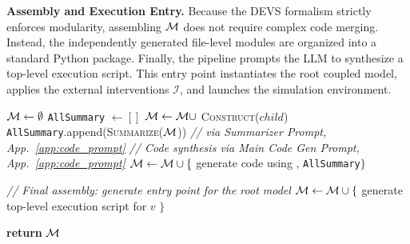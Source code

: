 \noindent\textbf{Assembly and Execution Entry.} 
Because the DEVS formalism strictly enforces modularity, assembling $\mathcal{M}$ does not require complex code merging. Instead, the independently generated file-level modules are organized into a standard Python package. Finally, the pipeline prompts the LLM to synthesize a top-level execution script. This entry point instantiates the root coupled model, applies the external interventions $\mathcal{I}$, and launches the simulation environment.


\begin{algorithm}[t]
\caption{\textsc{Stage 2: Behavioral Synthesis}}
\label{alg:devs_construct}
\begin{algorithmic}[1]
    \State $\mathcal{M} \leftarrow \emptyset$
    \State \texttt{AllSummary} $\leftarrow []$
        \State $\mathcal{M} \leftarrow \mathcal{M}\cup$ \textsc{Construct}($child$)
        \State \texttt{AllSummary}.append(\textsc{Summarize}($\mathcal{M}$)) \textit{// via Summarizer Prompt, App.~\ref{app:code_prompt}}
    \EndFor
    \State \textit{// Code synthesis via Main Code Gen Prompt, App.~\ref{app:code_prompt}}
    \State $\mathcal{M} \leftarrow \mathcal{M}\cup\{$ generate code using \plantree, \texttt{AllSummary}$\}$

    \State \textit{// Final assembly: generate entry point for the root model}
        \State $\mathcal{M} \leftarrow \mathcal{M} \cup \{$ generate top-level execution script for $v$ $\}$
    \EndIf

    \State \textbf{return} $\mathcal{M}$
\EndFunction
\end{algorithmic}
\end{algorithm}



